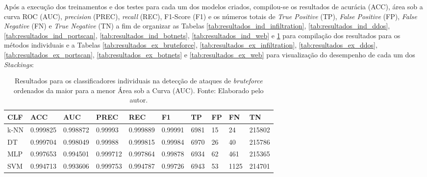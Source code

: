 





Após a execução dos treinamentos e dos testes para cada um dos modelos criados, compilou-se os resultados de acurácia (ACC), área sob a curva ROC (AUC), \textit{precision} (PREC), \textit{recall} (REC), F1-Score (F1) e os números totais de \textit{True Positive} (TP), \textit{False Positive} (FP), \textit{False Negative} (FN) e \textit{True Negative} (TN) a fim de organizar as Tabelas \ref{tab:resultados_ind_infiltration}, \ref{tab:resultados_ind_ddos}, \ref{tab:resultados_ind_portscan}, \ref{tab:resultados_ind_botnets}, \ref{tab:resultados_ind_web} e \ref{tab:resultados_ind_bruteforce} para compilação dos resultados para os métodos individuais e a Tabelas \ref{tab:resultados_ex_bruteforce}, \ref{tab:resultados_ex_infiltration}, \ref{tab:resultados_ex_ddos}, \ref{tab:resultados_ex_portscan}, \ref{tab:resultados_ex_botnets} e \ref{tab:resultados_ex_web} para visualização do desempenho de cada um dos \textit{Stackings}:









\begin{longtable}{l|l|l|l|l|l|l|l|l|l}
\caption{Resultados para os classificadores individuais na detecção de ataques de \textit{bruteforce} ordenados da maior para a menor Área sob a Curva (AUC). Fonte: Elaborado pelo autor.}
\label{tab:resultados_ind_bruteforce}

\hline

\textbf{CLF} & \textbf{ACC} 		& \textbf{AUC}      & \textbf{PREC} 	 & \textbf{REC}            & \textbf{F1}       & \textbf{TP}   & \textbf{FP} & \textbf{FN}   & \textbf{TN}     \\ \hline \hline
k-NN 		& 0.999825 	& 0.998872 & 0.99993  	 & 0.999889	  & 0.99991  & 6981 & 15 & 24   & 215802 \\ \hline
DT  		& 0.999704 	& 0.998049 & 0.99988  	 & 0.999815 	  & 0.99984 & 6970 & 26 & 40   & 215786 \\ \hline
MLP 		& 0.997653 	& 0.994501 & 0.999712 	 & 0.997864 	  & 0.99878 & 6934 & 62 & 461  & 215365 \\ \hline
SVM 		& 0.994713 	& 0.993606 & 0.999753 	 & 0.994787 	  & 0.99726 & 6943 & 53 & 1125 & 214701 \\ \hline


\end{longtable}







